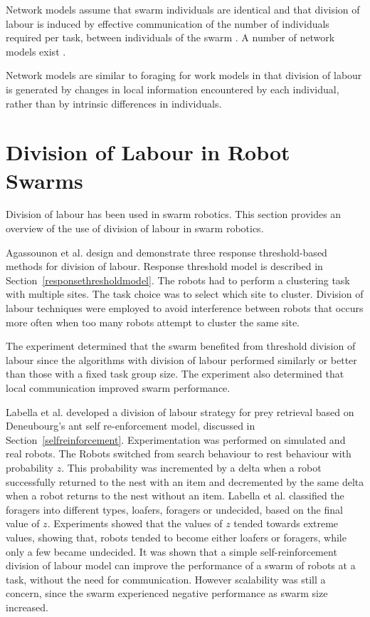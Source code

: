 Network models assume that swarm individuals are identical and that division of labour is induced by effective communication of the number of individuals required per task, between individuals of the swarm \cite{gordon1992parallel}. A number of network models exist \cite{gordon1992parallel,pacala1996effects}.

Network models are similar to foraging for work models in that division of labour is generated by changes in local information encountered by each individual, rather than by intrinsic differences in individuals. 


\section{Division of Labour in Robot Swarms}

Division of labour has been used in swarm robotics. This section provides an overview of the use of division of labour in swarm robotics.

Agassounon et al. \cite{agassounon2002efficiency} design and demonstrate three response threshold-based methods for division of labour. Response threshold model is described in Section~\ref{responsethresholdmodel}. The robots had to perform a clustering task with multiple sites. The task choice was to select which site to cluster. Division of labour techniques were employed to avoid interference between robots that occurs more often when too many robots attempt to cluster the same site. 

The experiment determined that the swarm benefited from threshold division of labour since the algorithms with division of labour performed similarly or better than those with a fixed task group size. The experiment also determined that local communication improved swarm performance.

Labella et al. \cite{labella2006division} developed a division of labour strategy for prey retrieval based on Deneubourg's ant self re-enforcement model, discussed in Section~\ref{selfreinforcement}. Experimentation was performed on simulated and real robots. The Robots switched from search behaviour to rest behaviour with probability $z$. This probability was incremented by a delta when a robot successfully returned to the nest with an item and decremented by the same delta when a robot returns to the nest without an item. Labella et al. classified the foragers into different types, loafers, foragers or  undecided, based on the final value of $z$. Experiments showed that the values of $z$ tended towards extreme values, showing that, robots tended to become either loafers or foragers, while only a few became undecided. It was shown that a simple self-reinforcement division of labour model can improve the performance of a swarm of robots at a task, without the need for communication. However scalability was still a concern, since the swarm experienced negative performance as swarm size increased. 

